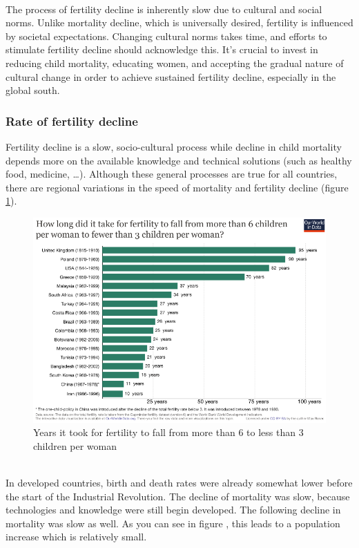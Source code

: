\documentclass[../summary.tex]{subfiles}
\begin{document}
\ \\
The process of fertility decline is inherently slow due to cultural and social norms. Unlike mortality decline, which is universally desired, fertility is influenced by societal expectations. Changing cultural norms takes time, and efforts to stimulate fertility decline should acknowledge this. It's crucial to invest in reducing child mortality, educating women, and accepting the gradual nature of cultural change in order to achieve sustained fertility decline, especially in the global south.

\subsubsection{Rate of fertility decline}

Fertility decline is a slow, socio-cultural process while decline in child mortality depends more on the available knowledge and technical solutions (such as healthy food, medicine, …). Although these general processes are true for all countries, there are regional variations in the speed of mortality and fertility decline (figure \ref{fig:years-it-took-fertility-to-fall-from-6-to-below-3}).

\begin{figure}[H]
	\centering
	\includegraphics[width=0.7\linewidth]{../images/Years-it-took-Fertility-to-fall-from-6-to-below-3}
	\caption{Years it took for fertility to fall from more than 6 to less than 3 children per woman}
	\label{fig:years-it-took-fertility-to-fall-from-6-to-below-3}
\end{figure}
\ \\
In developed countries, birth and death rates were already somewhat lower before the start of the Industrial Revolution. The decline of mortality was slow, because technologies and knowledge were still begin developed. The following decline in mortality was slow as well. As you can see in figure , this leads to a population increase which is relatively small.
\end{document}

